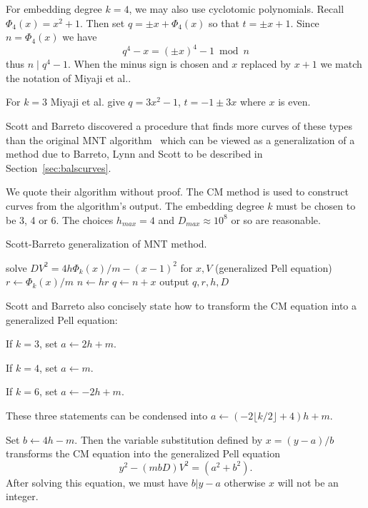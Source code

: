 For embedding degree $k=4$, we may also use cyclotomic polynomials.
Recall $\Phi_4(x) = x^2 + 1$. Then set $q = \pm x + \Phi_4(x)$
so that $t = \pm x + 1$. Since $n = \Phi_4(x)$ we have
\[ q^4 - x = (\pm x)^4 - 1 \bmod n \]
thus $n \mid q^4 - 1$.
When the minus sign is chosen and $x$ replaced by $x+1$ 
we match the notation of Miyaji et al.\cite{mnt}.

For $k=3$ Miyaji et al. give $q = 3 x^2 - 1$, $t = -1 \pm 3x$ where $x$ is
even.

Scott and Barreto discovered a procedure that finds more curves of these
types than the original MNT algorithm~\cite{moremnt}
which can be viewed as a generalization of a method due to
Barreto, Lynn and Scott to be described in Section~\ref{sec:balscurves}.

We quote their algorithm without proof.
The CM method is used to construct curves from the algorithm's output.
The embedding degree $k$ must be chosen to be 3, 4 or 6.
The choices $h_{max} = 4$ and $D_{max} \approx 10^8$ or so are reasonable.

\begin{algorithm}
\caption {Scott-Barreto generalization of MNT method.}
\begin{algorithmic}[1]
	    \STATE solve $DV^2 = 4 h \Phi_k(x) / m - (x-1)^2$ for $x, V$ (generalized Pell equation)
	    \STATE $r\gets \Phi_k(x) /m$
	    \STATE $n\gets hr$
	    \STATE $q\gets n + x$
		\STATE output $q, r, h, D$
	    \ENDIF
	\ENDFOR
    \ENDFOR
\ENDFOR
\end{algorithmic}
\end{algorithm}

Scott and Barreto also concisely state how to transform the CM equation
into a generalized Pell equation:

If $k = 3$, set $a \gets 2h + m$.

If $k = 4$, set $a \gets m$.

If $k = 6$, set $a \gets -2h + m$.

These three statements can be condensed into
$a \gets (-2 \lfloor k/2 \rfloor + 4)h + m$.

Set $b \gets 4h - m$. Then the variable substitution
defined by $x = (y-a)/b$ transforms the CM equation into the generalized
Pell equation
\[ y^2 - (mbD)V^2 = (a^2 + b^2) .\]
After solving this equation, we must have $b | y - a$ otherwise $x$ will
not be an integer.

